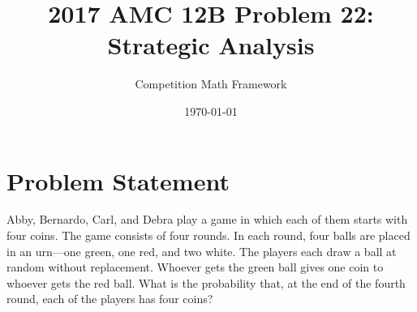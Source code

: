 \documentclass[]{article}
\begin{document}
\title{2017 AMC 12B Problem 22: Strategic Analysis}
\author{Competition Math Framework}
\date{\today}
\maketitle

\section*{Problem Statement}

Abby, Bernardo, Carl, and Debra play a game in which each of them starts with four coins. The game consists of four rounds. In each round, four balls are placed in an urn---one green, one red, and two white. The players each draw a ball at random without replacement. Whoever gets the green ball gives one coin to whoever gets the red ball. What is the probability that, at the end of the fourth round, each of the players has four coins?
\end{document}
